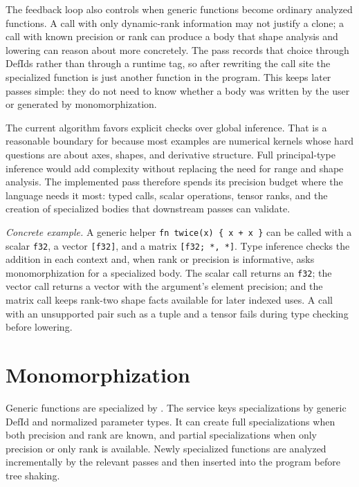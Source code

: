 The feedback loop also controls when generic functions become ordinary analyzed
functions. A call with only dynamic-rank information may not justify a clone; a
call with known precision or rank can produce a body that shape analysis and
lowering can reason about more concretely. The pass records that choice through
DefIds rather than through a runtime tag, so after rewriting the call site the
specialized function is just another function in the program. This keeps later
passes simple: they do not need to know whether a body was written by the user
or generated by monomorphization.

The current algorithm favors explicit checks over global inference. That is a
reasonable boundary for \einlang{} because most examples are numerical kernels
whose hard questions are about axes, shapes, and derivative structure. Full
principal-type inference would add complexity without replacing the need for
range and shape analysis. The implemented pass therefore spends its precision
budget where the language needs it most: typed calls, scalar operations,
tensor ranks, and the creation of specialized bodies that downstream passes can
validate.

\textit{Concrete example.} A generic helper \texttt{fn twice(x) \{ x + x \}}
can be called with a scalar \texttt{f32}, a vector \texttt{[f32]}, and a matrix
\texttt{[f32; *, *]}. Type inference checks the addition in each context and,
when rank or precision is informative, asks monomorphization for a specialized
body. The scalar call returns an \texttt{f32}; the vector call returns a vector
with the argument's element precision; and the matrix call keeps rank-two shape
facts available for later indexed uses. A call with an unsupported pair such as
a tuple and a tensor fails during type checking before lowering.

\section{Monomorphization}

Generic functions are specialized by
. The service keys
specializations by generic DefId and normalized parameter types. It can create
full specializations when both precision and rank are known, and partial
specializations when only precision or only rank is available. Newly specialized
functions are analyzed incrementally by the relevant passes and then inserted
into the program before tree shaking.

